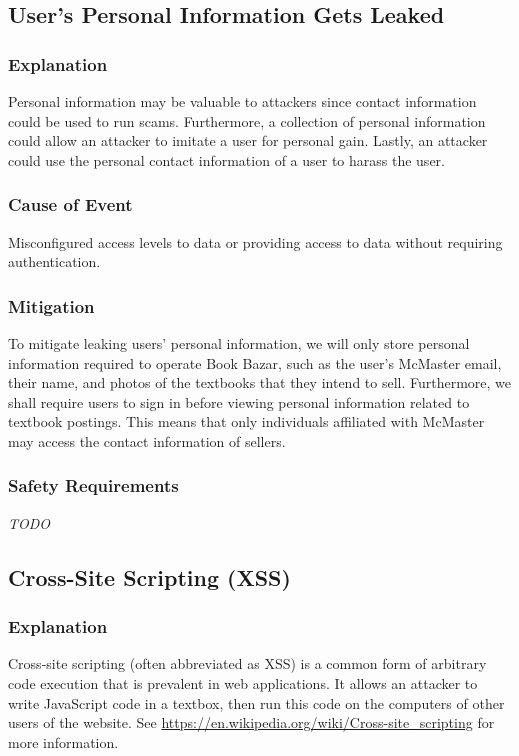 \documentclass[fullpage]{article}
\begin{document}
\subsection{User's Personal Information Gets Leaked}

\subsubsection*{Explanation}
Personal information may be valuable to attackers since contact information could be used to run scams. Furthermore, a collection of personal information could allow an attacker to imitate a user for personal gain. Lastly, an attacker could use the personal contact information of a user to harass the user.

\subsubsection*{Cause of Event}
Misconfigured access levels to data or providing access to data without requiring authentication.

\subsubsection*{Mitigation}
To mitigate leaking users’ personal information, we will only store personal information required to operate Book Bazar, such as the user’s McMaster email, their name, and photos of the textbooks that they intend to sell. Furthermore, we shall require users to sign in before viewing personal information related to textbook postings. This means that only individuals affiliated with McMaster may access the contact information of sellers.

\subsubsection*{Safety Requirements}
\emph{TODO}

\subsection{Cross-Site Scripting (XSS)}

\subsubsection*{Explanation}
Cross-site scripting (often abbreviated as XSS) is a common form of arbitrary code execution that is prevalent in web applications. It allows an attacker to write JavaScript code in a textbox, then run this code on the computers of other users of the website. See \url{https://en.wikipedia.org/wiki/Cross-site_scripting}  for more information.
\end{document}
